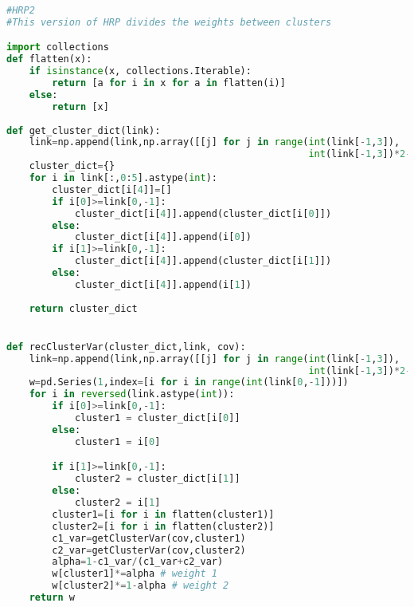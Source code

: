 \begin{lstlisting}[language=Python]
#HRP2
#This version of HRP divides the weights between clusters

import collections
def flatten(x):
    if isinstance(x, collections.Iterable):
        return [a for i in x for a in flatten(i)]
    else:
        return [x]
    
def get_cluster_dict(link):
    link=np.append(link,np.array([[j] for j in range(int(link[-1,3]),
                                                     int(link[-1,3])*2-1)]),axis=1)
    cluster_dict={}
    for i in link[:,0:5].astype(int):
        cluster_dict[i[4]]=[]
        if i[0]>=link[0,-1]:
            cluster_dict[i[4]].append(cluster_dict[i[0]])
        else:
            cluster_dict[i[4]].append(i[0])
        if i[1]>=link[0,-1]:
            cluster_dict[i[4]].append(cluster_dict[i[1]])
        else:
            cluster_dict[i[4]].append(i[1])
        
    return cluster_dict


def recClusterVar(cluster_dict,link, cov):
    link=np.append(link,np.array([[j] for j in range(int(link[-1,3]),
                                                     int(link[-1,3])*2-1)]),axis=1)
    w=pd.Series(1,index=[i for i in range(int(link[0,-1]))]) 
    for i in reversed(link.astype(int)):
        if i[0]>=link[0,-1]:
            cluster1 = cluster_dict[i[0]]
        else:
            cluster1 = i[0]

        if i[1]>=link[0,-1]:
            cluster2 = cluster_dict[i[1]]
        else:
            cluster2 = i[1]
        cluster1=[i for i in flatten(cluster1)]
        cluster2=[i for i in flatten(cluster2)]
        c1_var=getClusterVar(cov,cluster1)
        c2_var=getClusterVar(cov,cluster2)
        alpha=1-c1_var/(c1_var+c2_var)
        w[cluster1]*=alpha # weight 1
        w[cluster2]*=1-alpha # weight 2
    return w
\end{lstlisting}

